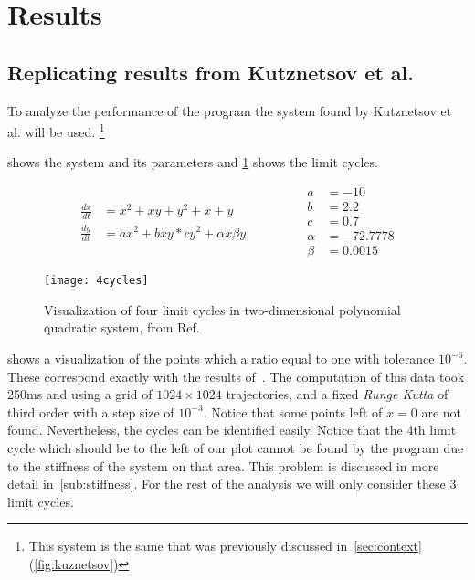 
\section{Results}

\subsection{Replicating results from Kutznetsov et al.}

To analyze the performance of the program the system found by Kutznetsov et al.
\cite{kuznetsov_visualization_2013} will be used.
\footnote{This system is the same that was previously discussed
in~\cref{sec:context} (\cref{fig:kuznetsov})}

 shows the system and its parameters and \cref{fig:kuznetsov2}
shows the limit cycles.

\begin{equation}%
    \label{eq:kuznetsov}
    \begin{split}
        \frac{dx}{dt} &= x^2 + xy + y^2 + x + y\\
        \frac{dy}{dt} &= ax^2 + bxy * cy^2 + \alpha x \beta y
    \end{split}
    \qquad \qquad
    \begin{split}
        a &= -10\\
        b &= 2.2\\
        c &= 0.7\\
        \alpha &= -72.7778\\
        \beta &= 0.0015
    \end{split}
\end{equation}

\begin{figure}[H]
    \centering
    \texttt{[image: 4cycles]}
    \caption{Visualization of four limit cycles in two-dimensional polynomial quadratic system, from Ref.~\cite{kuznetsov_visualization_2013}
    }%
    \label{fig:kuznetsov2}
\end{figure}

\pagebreak
{} shows a visualization of the points which a ratio
equal to one with tolerance $10^{-6}$. These correspond exactly with the results
of~\cite{kuznetsov_visualization_2013}. The computation of this data took 250ms
and using a grid of $1024 \times 1024$ trajectories, and a fixed \emph{Runge Kutta}
of third order with a step size of $10^{-3}$. Notice that some points left of $x
= 0$ are not found. Nevertheless, the cycles can be identified easily. Notice that the
4th limit cycle which should be to the left of our plot cannot be found by the program
due to the stiffness of the system on that area. This problem is discussed in more detail
in~\cref{sub:stiffness}. For the rest of the analysis we will only consider
these 3 limit cycles.


